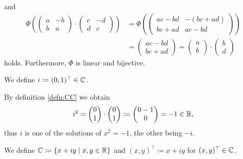 \documentclass[a4paper,english]{article}
\begin{document}
and
\begin{align*}
    \Phi\left(\begin{pmatrix} a & - b \\ b & a \end{pmatrix} \cdot \begin{pmatrix} c & - d \\ d & c \end{pmatrix}\right)
    & = \Phi\left(\begin{pmatrix} a c - b d & - (b c + a d) \\ b c + a d & a c - b d \end{pmatrix}\right) \\
    & = \begin{pmatrix} a c - b d \\ b c + a d \end{pmatrix}
    = \begin{pmatrix} a \\ b \end{pmatrix} \cdot \begin{pmatrix} b \\ d \end{pmatrix}
\end{align*}
holds.
Furthermore, $\Phi$ is linear and bijective.

\begin{defn}
    We define $i \coloneqq (0, 1)^{\top} \in \operatorname{\mathbb{C}}$.
\end{defn}

By definition \ref{defn:CC} we obtain
\begin{equation*}
    i^2
    = \begin{pmatrix} 0 \\ 1 \end{pmatrix}
        \cdot \begin{pmatrix} 0 \\ 1 \end{pmatrix}
        \coloneqq \begin{pmatrix}
            0 - 1 \\
            0
        \end{pmatrix}
        = -1 \in \operatorname{\mathbb{R}},
\end{equation*}
thus $i$ is one of the solutions of $x^2 = - 1$, the other being $-i$.

\begin{defn}[$\CC$, Version II]
    We define $\operatorname{\mathbb{C}} \coloneqq \{ x+ i y \mid x,y \in \operatorname{\mathbb{R}}\}$ and $(x, y)^{\top} \coloneqq x + i y$ for $(x, y)^{\top} \in \operatorname{\mathbb{C}}$.
\end{defn}
\end{document}

